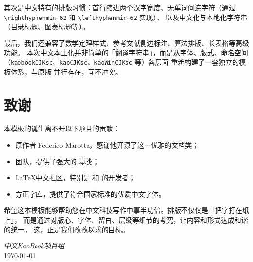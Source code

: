 其次是中文特有的排版习惯：首行缩进两个汉字宽度、无单词间连字符（通过
\lstinline|\righthyphenmin=62| 和 \lstinline|\lefthyphenmin=62| 实现）、
以及中文化与本地化字符串（目录标题、图表标题等）。

%
%
%


最后，我们还兼容了数学定理样式、参考文献侧边标注、算法排版、长表格等高级功能。
本次中文本土化并非简单的「翻译字符串」，而是从字体、版式、命名空间
（\texttt{kaobookCJKsc}、\texttt{kaoCJKsc}、\texttt{kaoWinCJKsc} 等）各层面
重新构建了一套独立的模板体系，与原版  并行存在，互不冲突。

\section*{致谢}

本模板的诞生离不开以下项目的贡献：
\begin{itemize}
    \item {} 原作者 Federico Marotta，感谢他开源了这一优雅的文档类；
    \item \KOMAScript 团队，提供了强大的  基类；
    \item \LaTeX 中文社区，特别是  和  的开发者；
    \item 方正字库，提供了符合国家标准的优质中文字体。
\end{itemize}


希望这本模板能够帮助您在中文科技写作中事半功倍。排版不仅仅是「把字打在纸上」，
而是通过对版心、字体、留白、层级等细节的考究，让内容和形式达成和谐的统一。
这，正是我们孜孜以求的目标。

\begin{flushright}
    \textit{中文KaoBook项目组}\\
    \today
\end{flushright}
